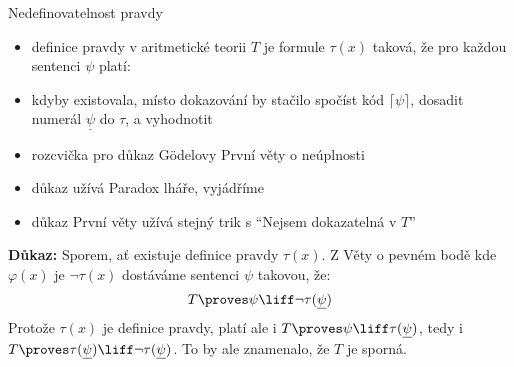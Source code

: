 \documentclass{beamer}
\begin{document}
\begin{frame}{Nedefinovatelnost pravdy}

    \pause
    \vspace{-12pt}
    \pause
    \begin{itemize}
        \item \alert{definice pravdy} v aritmetické teorii $T$ je formule $\tau(x)$ taková, že pro každou sentenci $\psi$ platí: 
        \pause
        \item kdyby existovala, místo dokazování by stačilo spočíst kód $\lceil \psi\rceil$, dosadit numerál $\underline{\psi}$ do $\tau$, a vyhodnotit\pause
        \item rozcvička pro důkaz Gödelovy První věty o neúplnosti\pause
        \item důkaz užívá \alert{Paradox lháře}, vyjádříme \pause
        \item důkaz První věty užívá stejný trik s ``Nejsem dokazatelná v $T$''\pause
    \end{itemize}
    \vspace{-3pt}
    \textbf{Důkaz:} \pause Sporem, ať existuje definice pravdy $\tau(x)$. Z Věty o pevném bodě kde $\varphi(x)$ je $\neg\tau(x)$ dostáváme sentenci $\psi$ takovou, že:
    $$
    T\proves\psi\liff\neg\tau(\underline{\psi})
    $$
    \pause
    Protože $\tau(x)$ je definice pravdy, platí ale i $T\proves\psi\liff\tau(\underline{\psi})$, tedy i $T\proves\tau(\underline{\psi})\liff\neg\tau(\underline{\psi})$. To by ale znamenalo, že $T$ je sporná.
    \hfill\qedsymbol
    
\end{frame}
\end{document}
